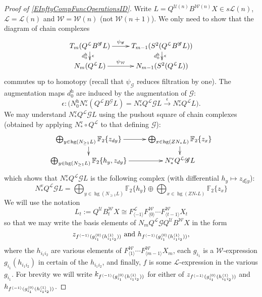 \documentclass[11pt]{amsart} \renewcommand{\baselinestretch}{1.4}
\theoremstyle{plain}
\theoremstyle{definition}
\DeclareMathOperator{\homog}{hg}
\renewcommand{\to}{\longrightarrow}
\newcommand{\scrG}{\mathscr{G}}
\newcommand{\calU}{\mathcal{U}}
\newcommand{\calL}{\mathcal{L}}
\newcommand{\calw}{\mathcal{W}}
\newcommand{\call}{\mathcal{L}}
\newcommand{\BSW}{{\scrG}}
\newcommand{\BSWres}{B^\BSW}%
\newcommand{\F}{\mathbb{F}}
\newcommand{\Ftwo}{\F_2}
\newcommand{\uver}{^\mathrm{v}}
\newcommand{\uhor}{^\mathrm{h}}
\renewcommand{\mapsto}{\longmapsto}
\begin{document}
\begin{Operations in composite functor spectral sequences}
\begin{proof}[Proof of \ref{EInftyCompFuncOperationsID}]
Write $L=Q^{\calU(n)} B^{\calw(n)}X \in s\calL(n)$,  $\calL=\calL(n)$ and $\calw=\calw(n)$ (not $\calw(n+1)$). We only need to show that the diagram of chain complexes
\[\xymatrix@R=4mm{
T_{m}(Q^{\calL}\BSWres L)
\ar[r]^-{\psi_\BSW}
\ar[d]^-{\epsilon}_-{d\uhor_0}
&%
T_{m-1}(S^2(Q^{\calL}\BSWres L))\ar[d]^-{\epsilon}_-{d\uhor_0}
\\%
N_{m}(Q^{\calL}L)
\ar[r]^-{\psi_{\calw}}
&%
N_{m-1}(S^2(Q^{\calL} L))
}\]
commutes up to homotopy (recall that $\psi_\BSW$ reduces filtration by one).  The augmentation maps $d\uhor_0$ are induced by the augmentation of $\BSW$:
\[\epsilon:\bigl(N\uhor_0N\uver_*(Q^{\call}\BSWres L)= N\uver_*Q^{\calL}\BSW L\overset{\epsilon}{\to} N\uver_*Q^{\calL}L\bigr). \]%
We may understand $ N\uver_*Q^{\calL}\BSW L$ using the pushout square of chain complexes (obtained by applying $N\uver_*\circ Q^{\call} $ to that defining $\BSW$):
\[\xymatrix@R=4mm{
\bigoplus_{y\in \homog (N_{\geq1}L)}\Ftwo\{z_{dy}\}
\ar[r]\ar[d]%
&%
\bigoplus_{x\in \homog (ZN_*L)}\Ftwo\{z_{x}\}\ar[d]\\%
\bigoplus_{y\in \homog (N_{\geq1}L)}\Ftwo\{h_y,z_{dy}\}
\ar[r]&%
N\uver_*Q^{\call}\BSW L%
}\]
which shows that $N\uver_*Q^{\call}\BSW L$ is the following complex (with differential $h_{y}\mapsto z_{d\uver_0y}$):
\[N\uver_*Q^{\call}\BSW L=\textstyle\bigoplus_{y\in \homog (N_{\geq1}L)}\Ftwo\{h_y\}\oplus \bigoplus_{x\in \homog (ZN_*L)}\Ftwo\{z_{x}\}\]
We will use the notation
\[L_t:=Q^{\calU}B^{\calw}_tX \cong F^{\calL}_{\langle -1\rangle}F^{\calw}_{\langle 0\rangle}\cdots F^{\calw}_{\langle t-1\rangle}X_t\]
so that we may write the basis elements of $N_mQ^{\calL}\BSW Q^{\calU}B^{\calw}X$ in the form
\[z_{f^{\langle -1\rangle}(g^{\smash{\langle} 0\smash{\rangle}}_{i_1}(h^{\smash{\langle} 1\smash{\rangle}}_{i_1i_2}))} \textup{ and }h_{f^{\langle -1\rangle}(g^{\smash{\langle} 0\smash{\rangle}}_{i_1}(h^{\smash{\langle} 1\smash{\rangle}}_{i_1i_2}))},\]
where the $h_{i_1i_2} $ are various elements of $ F^{\calw}_{\langle 1\rangle}\cdots F^{\calw}_{\langle m-1\rangle}X_m$, each $g_{i_1}$ is a $\calw$-expression $g_{i_1}(h_{i_1i_2})$ in certain of the $h_{i_1i_2}$, and finally, $f$ is some $\calL$-expression in the various $g_{i_1}$. %
For brevity we will write $k_{f^{\langle -1\rangle}(g^{\smash{\langle} 0\smash{\rangle}}_{i_1}(h^{\smash{\langle} 1\smash{\rangle}}_{i_1i_2}))}$ for either of $z_{f^{\langle -1\rangle}(g^{\smash{\langle} 0\smash{\rangle}}_{i_1}(h^{\smash{\langle} 1\smash{\rangle}}_{i_1i_2}))}$ and $h_{f^{\langle -1\rangle}(g^{\smash{\langle} 0\smash{\rangle}}_{i_1}(h^{\smash{\langle} 1\smash{\rangle}}_{i_1i_2}))}$.


\end{proof}
\end{Operations in composite functor spectral sequences}
\end{document}
